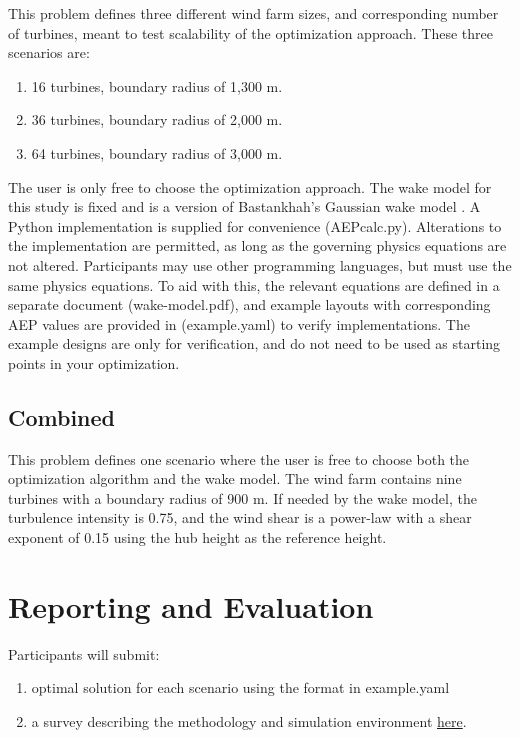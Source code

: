 \documentclass{article}
\begin{document}
This problem defines three different wind farm sizes, and corresponding number of turbines, meant to test scalability of the optimization approach.  These three scenarios are:
\begin{enumerate}
    \item 16 turbines, boundary radius of 1,300 m.
    \item 36 turbines, boundary radius of 2,000 m.
    \item 64 turbines, boundary radius of 3,000 m.
\end{enumerate}

The user is only free to choose the optimization approach.  The wake model for this study is fixed and is a version of Bastankhah's Gaussian wake model \cite{Thomas2018, Bastankhah2014, Bastankhah2016}.  A Python implementation is supplied for convenience (AEPcalc.py). Alterations to the implementation are permitted, as long as the governing physics equations are not altered.  Participants may use other programming languages, but must use the same physics equations.  To aid with this, the relevant equations are defined in a separate document (wake-model.pdf), and example layouts with corresponding AEP values are provided in (example.yaml) to verify implementations.  The example designs are only for verification, and do not need to be used as starting points in your optimization.  

\subsection{Combined}

This problem defines one scenario where the user is free to choose both the optimization algorithm and the wake model.  The wind farm contains nine turbines with a boundary radius of 900 m.  If needed by the wake model, the turbulence intensity is 0.75, and the wind shear is a power-law with a shear exponent of 0.15 using the hub height as the reference height.

\section{Reporting and Evaluation}

Participants will submit:
\begin{enumerate}
    \item optimal solution for each scenario using the format in example.yaml 
    \item a survey describing the methodology and simulation environment \url{here}.
\end{enumerate}
\end{document}
